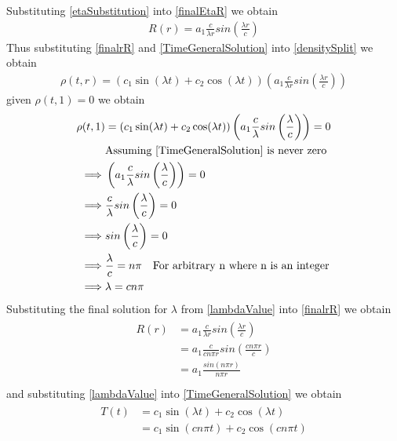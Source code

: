 \documentclass[10pt]{article}
\numberwithin{equation}{section}
\begin{document}
		\section{}
		Substituting \ref{etaSubstitution} into \ref{finalEtaR} we obtain
		\begin{align}\label{finalrR}
			R(r) = a_1\frac{c}{\lambda r}sin\left(\frac{\lambda r}{c}\right)
		\end{align}
		Thus substituting \ref{finalrR} and \ref{TimeGeneralSolution} into \ref{densitySplit} we obtain
		\begin{align}
			\rho(t,r) = (c_1 \sin(\lambda t) + c_2 \cos(\lambda t))\left(a_1\frac{c}{\lambda r}sin\left(\frac{\lambda r}{c}\right)\right)
		\end{align}
		given \(\rho(t,1) = 0\) we obtain
		\begin{align}\label{lambdaValue}
		\begin{split}
			\rho(t,1) &= (c_1 \sin(\lambda t) + c_2 \cos(\lambda t))\left(a_1\frac{c}{\lambda}sin\left(\frac{\lambda}{c}\right)\right) = 0\\
			&\text{Assuming \ref{TimeGeneralSolution} is never zero}\\
			\implies&\left(a_1\frac{c}{\lambda}sin\left(\frac{\lambda}{c}\right)\right) = 0\\
			\implies&\frac{c}{\lambda}sin\left(\frac{\lambda}{c}\right)=0\\
			\implies&sin\left(\frac{\lambda}{c}\right)=0\\
			\implies&\frac{\lambda}{c} = n\pi \quad\text{For arbitrary n where n is an integer}\\
			\implies &\lambda = c n \pi 
		\end{split}
		\end{align}
		Substituting the final solution for \(\lambda\) from \ref{lambdaValue} into \ref{finalrR} we obtain
		\begin{align}\label{finalREquation}
			\begin{split}
			R(r) &= a_1\frac{c}{\lambda r}sin\left(\frac{\lambda r}{c}\right)\\
			&= a_1\frac{c}{c n \pi r}sin\left(\frac{c n \pi r}{c}\right)\\
			&= a_1\frac{sin\left(n \pi r\right)}{n \pi r}\\
			\end{split}
		\end{align}
		and substituting \ref{lambdaValue} into \ref{TimeGeneralSolution} we obtain
		\begin{align}\label{finalTEquation}
			\begin{split}
			T(t) &= c_1 \sin(\lambda t) + c_2 \cos(\lambda t)\\
			&= c_1 \sin(cn\pi t) + c_2 \cos(cn\pi t)\\
			\end{split}
		\end{align}
\end{document}
